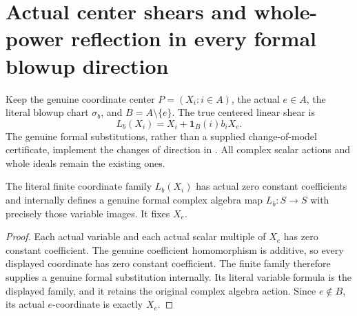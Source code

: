 \section{Actual center shears and whole-power reflection in every formal blowup direction}

Keep the genuine coordinate center $P=(X_i:i\in A)$, the actual
$e\in A$, the literal blowup chart $\sigma_b$, and $B=A\setminus\{e\}$.
The true centered linear shear is
\[
 L_b(X_i)=X_i+\mathbf1_B(i)b_iX_e.
\]
The genuine formal substitutions, rather than a supplied change-of-model
certificate, implement the changes of direction in
\cite[\S7, pp.~267--272]{bierstone-milman97-invent-math}.
All complex scalar actions and whole ideals remain the existing ones.

\begin{lemma}
\label{hir:actual-formal-center-shear-coordinate-map}
The literal finite coordinate family $L_b(X_i)$ has actual zero constant
coefficients and internally defines a genuine formal complex algebra map
$L_b:S\to S$ with precisely those variable images. It fixes $X_e$.
\leanok
\end{lemma}
\begin{proof}
Each actual variable and each actual scalar multiple of $X_e$ has zero
constant coefficient. The genuine coefficient homomorphism is additive,
so every displayed coordinate has zero constant coefficient. The finite
family therefore supplies a genuine formal substitution internally.
Its literal variable formula is the displayed family, and it retains
the original complex algebra action. Since $e\notin B$, its actual
$e$-coordinate is exactly $X_e$.
\end{proof}

